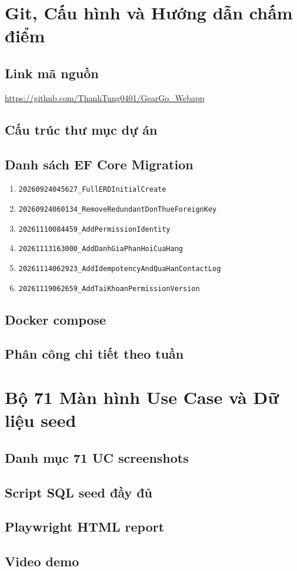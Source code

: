 \appendix

\chapter{Git, Cấu hình và Hướng dẫn chấm điểm}
\label{apx:a}

\section{Link mã nguồn}
\url{https://github.com/ThanhTung0401/GearGo_Webapp}

\section{Cấu trúc thư mục dự án}

\section{Danh sách EF Core Migration}
\begin{enumerate}
  \item \texttt{20260924045627\_FullERDInitialCreate}
  \item \texttt{20260924060134\_RemoveRedundantDonThueForeignKey}
  \item \texttt{20261110084459\_AddPermissionIdentity}
  \item \texttt{20261113163000\_AddDanhGiaPhanHoiCuaHang}
  \item \texttt{20261114062923\_AddIdempotencyAndQuaHanContactLog}
  \item \texttt{20261119062659\_AddTaiKhoanPermissionVersion}
\end{enumerate}

\section{Docker compose}

\section{Phân công chi tiết theo tuần}

\chapter{Bộ 71 Màn hình Use Case và Dữ liệu seed}
\label{apx:b}

\section{Danh mục 71 UC screenshots}

\section{Script SQL seed đầy đủ}

\section{Playwright HTML report}

\section{Video demo}
